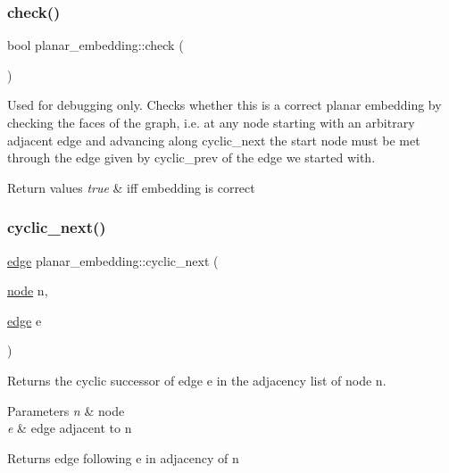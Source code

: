 \subsubsection{\texorpdfstring{check()}{check()}}
{\footnotesize\ttfamily bool planar\+\_\+embedding\+::check (\begin{DoxyParamCaption}{ }\end{DoxyParamCaption})}

Used for debugging only. Checks whether this is a correct planar embedding by checking the faces of the graph, i.\+e. at any node starting with an arbitrary adjacent edge and advancing along {\ttfamily cyclic\+\_\+next} the start node must be met through the edge given by {\ttfamily cyclic\+\_\+prev} of the edge we started with.


\begin{DoxyRetVals}{Return values}
{\em true} & iff embedding is correct \\
\hline
\end{DoxyRetVals}
\mbox{\label{classplanar__embedding_a4498733be831e1468044db038452efa4}} 
\subsubsection{\texorpdfstring{cyclic\+\_\+next()}{cyclic\_next()}}
{\footnotesize\ttfamily \mbox{\hyperlink{classedge}{edge}} planar\+\_\+embedding\+::cyclic\+\_\+next (\begin{DoxyParamCaption}\item[{\mbox{\hyperlink{classnode}{node}}}]{n,  }\item[{\mbox{\hyperlink{classedge}{edge}}}]{e }\end{DoxyParamCaption})}

Returns the cyclic successor of edge {\ttfamily e} in the adjacency list of node {\ttfamily n}.


\begin{DoxyParams}{Parameters}
{\em n} & node \\
\hline
{\em e} & edge adjacent to {\ttfamily n} \\
\hline
\end{DoxyParams}
\begin{DoxyReturn}{Returns}
edge following {\ttfamily e} in adjacency of {\ttfamily n} 
\end{DoxyReturn}
\mbox{\label{classplanar__embedding_ae4d5e8226c1088c17e15ee6447133383}} 
